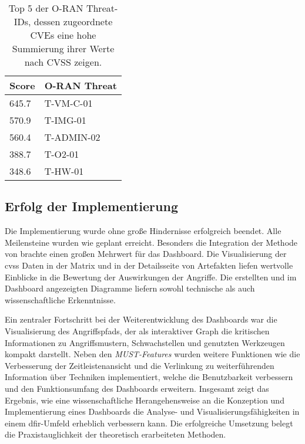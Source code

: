 \begin{table}[h]
    \centering
    \caption{Top 5 der O-RAN Threat-IDs, dessen zugeordnete CVEs eine hohe Summierung ihrer Werte nach CVSS zeigen.}
    \begin{tabular}{|l|l|}
    \hline
        Score & O-RAN Threat \\ \hline
        645.7 & T-VM-C-01 \\ \hline
        570.9 & T-IMG-01 \\ \hline
        560.4 & T-ADMIN-02 \\ \hline
        388.7 & T-O2-01 \\ \hline
        348.6 & T-HW-01 \\ \hline
    \end{tabular}
    \label{tab:top5-threats}
\end{table}

\subsection{Erfolg der Implementierung}
Die Implementierung wurde ohne große Hindernisse erfolgreich beendet. Alle Meilensteine wurden wie geplant erreicht. Besonders die Integration der Methode von \citeauthor{klementSecuring6GTransition2024} brachte einen großen Mehrwert für das Dashboard. Die Visualisierung der \gls{cvss} Daten in der Matrix und in der Detailsseite von Artefakten liefen wertvolle Einblicke in die Bewertung der Auswirkungen der Angriffe. Die erstellten und im Dashboard angezeigten Diagramme liefern sowohl technische als auch wissenschaftliche Erkenntnisse.

Ein zentraler Fortschritt bei der Weiterentwicklung des Dashboards war die Visualisierung des Angriffspfads, der als interaktiver Graph die kritischen Informationen zu Angriffsmustern, Schwachstellen und genutzten Werkzeugen kompakt darstellt. Neben den \textit{MUST-Features} wurden weitere Funktionen wie die Verbesserung der Zeitleistenansicht und die Verlinkung zu weiterführenden Information über Techniken implementiert, welche die Benutzbarkeit verbessern und den Funktionsumfang des Dashboards erweitern. Insgesamt zeigt das Ergebnis, wie eine wissenschaftliche Herangehensweise an die Konzeption und Implementierung eines Dashboards die Analyse- und Visualisierungsfähigkeiten in einem \gls{dfir}-Umfeld erheblich verbessern kann. Die erfolgreiche Umsetzung belegt die Praxistauglichkeit der theoretisch erarbeiteten Methoden.

